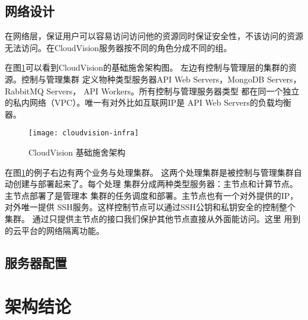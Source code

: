 \subsection{网络设计}
在网络层，保证用户可以容易访问访问他的资源同时保证安全性，不该访问的资源
无法访问。在CloudVision服务器按不同的角色分成不同的组。

在图\ref{fig:cloudvision-infra}可以看到CloudVision的基础施舍架构图。
左边有控制与管理层的集群的资源。控制与管理集群
定义物种类型服务器API Web Servers，MongoDB Servers，
RabbitMQ Servers， API Workers。所有控制与管理服务器类型
都在同一个独立的私内网络（VPC）。唯一有对外比如互联网IP是
API Web Servers的负载均衡器。
\begin{figure}[h]
  \centering
    \texttt{[image: cloudvision-infra]}
  \caption{CloudVision 基础施舍架构}
  \label{fig:cloudvision-infra}
\end{figure}

在图\ref{fig:cloudvision-infra}的例子右边有两个业务与处理集群。
这两个处理集群是被控制与管理集群自动创建与部署起来了。每个处理
集群分成两种类型服务器：主节点和计算节点。主节点部署了是管理本
集群的任务调度和部署。主节点也有一个对外提供的IP，对外唯一提供
SSH服务。这样控制节点可以通过SSH公钥和私钥安全的控制整个集群。
通过只提供主节点的接口我们保护其他节点直接从外面能访问。这里
用到的云平台的网络隔离功能。

\subsection{服务器配置}





\section{架构结论}
